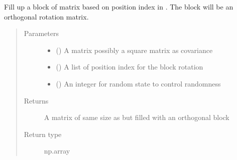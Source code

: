 \documentclass[letterpaper,10pt,english]{sphinxmanual}
\begin{document}
\begin{fulllineitems}
\label{\detokenize{Utilities:pysimrel.utilities.get_rotate}}
Fill up a block of matrix  based on position index in .
The block will be an orthogonal rotation matrix.
\begin{quote}\begin{description}
\item[{Parameters}] \leavevmode\begin{itemize}
\item {} 
 () \textendash{} A matrix possibly a square matrix as covariance

\item {} 
 () \textendash{} A list of position index for the block rotation

\item {} 
 () \textendash{} An integer for random state to control randomness

\end{itemize}

\item[{Returns}] \leavevmode
A matrix of same size as  but filled with an orthogonal block

\item[{Return type}] \leavevmode
np.array

\end{description}\end{quote}

\end{fulllineitems}

\end{document}
